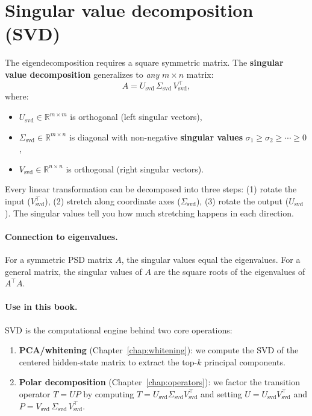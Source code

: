 \documentclass[11pt, twoside, openright]{memoir}
\begin{document}
\section{Singular value decomposition (SVD)}
\label{sec:svd}

The eigendecomposition requires a square symmetric matrix.  The
\textbf{singular value decomposition} generalizes to \emph{any}
$m\times n$ matrix:
\[
  A = U_{\mathrm{svd}} \,\Sigma_{\mathrm{svd}}\, V_{\mathrm{svd}}^\top,
\]
where:
\begin{itemize}[nosep]
  \item $U_{\mathrm{svd}} \in \mathbb{R}^{m \times m}$ is orthogonal
    (left singular vectors),
  \item $\Sigma_{\mathrm{svd}} \in \mathbb{R}^{m \times n}$ is diagonal
    with non-negative \textbf{singular values}
    $\sigma_1 \geq \sigma_2 \geq \cdots \geq 0$,
  \item $V_{\mathrm{svd}} \in \mathbb{R}^{n \times n}$ is orthogonal
    (right singular vectors).
\end{itemize}

\begin{keyidea}
Every linear transformation can be decomposed into three steps: (1) rotate
the input ($V_{\mathrm{svd}}^\top$), (2) stretch along coordinate axes
($\Sigma_{\mathrm{svd}}$), (3) rotate the output ($U_{\mathrm{svd}}$).
The singular values tell you how much stretching happens in each direction.
\end{keyidea}

\paragraph{Connection to eigenvalues.}
For a symmetric PSD matrix $A$, the singular values equal the eigenvalues.
For a general matrix, the singular values of $A$ are the square roots of
the eigenvalues of $A^\top A$.

\paragraph{Use in this book.}
SVD is the computational engine behind two core operations:
\begin{enumerate}[nosep]
  \item \textbf{PCA/whitening} (Chapter~\ref{chap:whitening}): we compute
    the SVD of the centered hidden-state matrix to extract the top-$k$
    principal components.
  \item \textbf{Polar decomposition} (Chapter~\ref{chap:operators}): we factor
    the transition operator $T = UP$ by computing $T = U_{\mathrm{svd}}
    \Sigma_{\mathrm{svd}} V_{\mathrm{svd}}^\top$ and setting
    $U = U_{\mathrm{svd}} V_{\mathrm{svd}}^\top$ and
    $P = V_{\mathrm{svd}}\, \Sigma_{\mathrm{svd}}\, V_{\mathrm{svd}}^\top$.
\end{enumerate}
\end{document}
